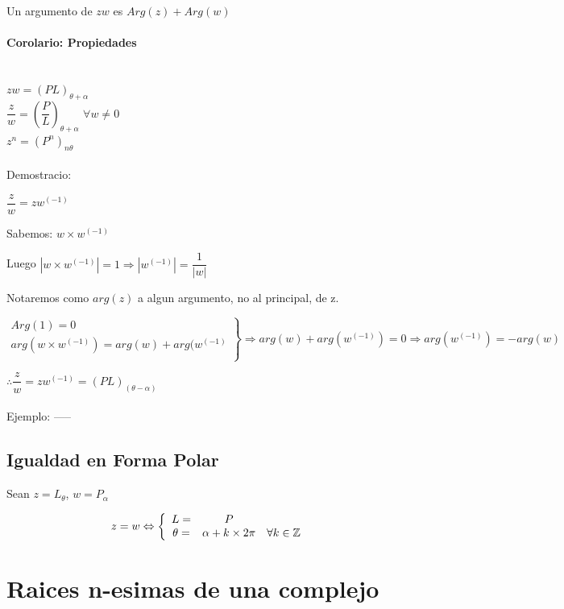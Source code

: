 Un argumento de $zw$ es $Arg(z)+Arg(w)$\\

\paragraph{Corolario: Propiedades}
\quad \\

$zw=(PL)_{\theta +\alpha}$\\

$\dfrac{z}{w} = \left( \dfrac{P}{L} \right) _{\theta + \alpha}$ $\forall w \neq 0$\\

$z^n=(P^n)_{n\theta}$\\
\\
Demostracio:

$\dfrac{z}{w}=zw^{(-1)}$

Sabemos: $w\times w^{(-1)}$

Luego $|w\times w^{(-1)}|=1 \Rightarrow |w^{(-1)}|=\dfrac{1}{|w|}$

Notaremos como $arg(z)$ a algun argumento, no al principal, de z.

$\left. \begin{array}{c}
Arg(1)=0 \\
arg(w\times w ^{(-1)})=arg(w)+arg(w^{(-1
)}\\
\end{array} \right\} \Rightarrow arg(w)+arg(w^{(-1)})=0 \Rightarrow arg(w^{(-1)}) = -arg(w)$

$\therefore \dfrac{z}{w}=zw^{(-1)}=\left(PL\right)_(\theta - \alpha)$\\
\\
Ejemplo:
-----

\subsection{Igualdad en Forma Polar}

Sean $z=L_\theta$, $w=P_\alpha$

$$z=w \Leftrightarrow \left\{ \begin{array}{c c c}
L=& P &\\
\theta = & \alpha + k \times 2\pi & \forall k \in \mathbb{Z} \\
\end{array} \right.$$

\section{Raices n-esimas de una complejo}

